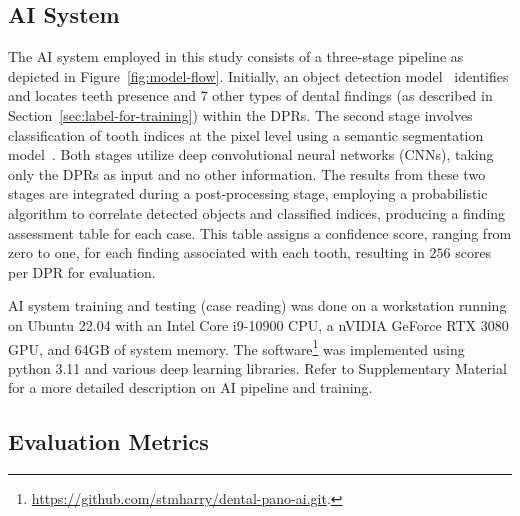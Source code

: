 \subsection{AI System}
\label{sec:ai-system}

The AI system employed in this study consists of a three-stage pipeline as depicted in Figure~\ref{fig:model-flow}.
Initially, an object detection model~\citep{redmon2016you} identifies and locates teeth presence and 7 other types of dental findings (as described in Section~\ref{sec:label-for-training}) within the DPRs.
The second stage involves classification of tooth indices at the pixel level using a semantic segmentation model~\citep{chen2017deeplab}.
Both stages utilize deep convolutional neural networks (CNNs), taking only the DPRs as input and no other information.
The results from these two stages are integrated during a post-processing stage, employing a probabilistic algorithm to correlate detected objects and classified indices, producing a finding assessment table for each case.
This table assigns a confidence score, ranging from zero to one, for each finding associated with each tooth, resulting in $\num{256}$ scores per DPR for evaluation.

AI system training and testing (case reading) was done on a workstation running on Ubuntu 22.04 with an Intel Core i9-10900 CPU, a nVIDIA GeForce RTX 3080 GPU, and 64GB of system memory.
The software\footnote{\url{https://github.com/stmharry/dental-pano-ai.git}.} was implemented using python 3.11 and various deep learning libraries.
Refer to Supplementary Material for a more detailed description on AI pipeline and training.

\subsection{Evaluation Metrics}


